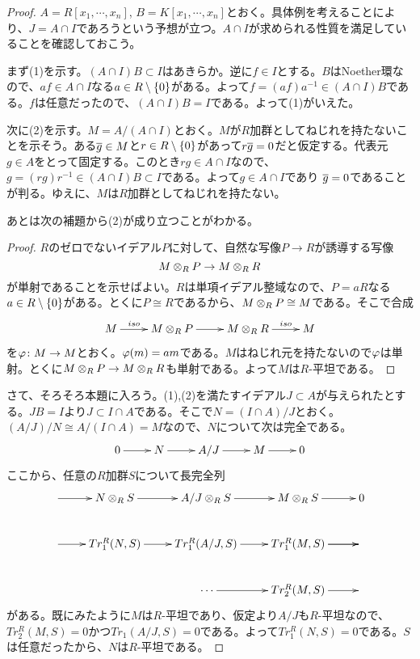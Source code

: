 \begin{proof}
  $A = R[x_1, \cdots , x_n]$, $B = K[x_1, \cdots , x_n]$とおく。具体例を考えることにより、$J=A \cap I$であろうという予想が立つ。$A \cap I$が求められる性質を満足していることを確認しておこう。

  まず(1)を示す。$(A \cap I)B \subset I$はあきらか。逆に$f \in I$とする。$B$はNoether環なので、$af \in A \cap I$なる$a \in R \setminus \{0\}$がある。よって$f = (af)a^{-1} \in (A \cap I)B$である。$f$は任意だったので、$(A \cap I)B = I$である。よって(1)がいえた。

  次に(2)を示す。$M = A/(A \cap I)$とおく。$M$が$R$加群としてねじれを持たないことを示そう。ある$\overline{g} \in M$と$r \in R \setminus \{0\}$があって$r \overline{g} = 0$だと仮定する。代表元$g \in A$をとって固定する。このとき$rg \in A \cap I$なので、$g = (rg)r^{-1} \in (A \cap I)B \subset I$である。よって$g \in A \cap I$であり
  $\overline{g} = 0$であることが判る。ゆえに、$M$は$R$加群としてねじれを持たない。

あとは次の補題から(2)が成り立つことがわかる。
\begin{proof}
  $R$のゼロでないイデアル$P$に対して、自然な写像$P \to R$が誘導する写像
  \[
  M \otimes_R P \to M \otimes_R R
  \]
  が単射であることを示せばよい。$R$は単項イデアル整域なので、$P = aR$なる$a \in R \setminus \{ 0 \}$がある。とくに$P \cong R$であるから、$M \otimes_R P \cong M$である。そこで合成
  \[
  \xymatrix{
  M \ar[r]^-{iso} & M \ts_R P  \ar[r] & M \ts_R R \ar[r]^-{iso} & M
  }
  \]
  を${\varphi} \colon M \to M$とおく。${\varphi}(m)=am$である。$M$はねじれ元を持たないので${\varphi}$は単射。とくに$  M \otimes_R P \to M \otimes_R R$も単射である。よって$M$は$R$-平坦である。
\end{proof}

さて、そろそろ本題に入ろう。(1),(2)を満たすイデアル$J \subset A$が与えられたとする。$JB=I$より$J \subset I \cap A$である。そこで$N = (I \cap A)/J$とおく。$(A/J)/N \cong A/ (I \cap A) = M$なので、$N$について次は完全である。
\[
\xymatrix{
0 \ar[r] & N \ar[r] & A/J \ar[r] & M \ar[r] & 0
}
\]
ここから、任意の$R$加群$S$について長完全列
\[
\xymatrix{
{} \ar[r] & N \ts_R S \ar[r] & A/J \ts_R S \ar[r] & M \ts_R S \ar[r] & 0 \\
{} \ar[r] & Tr_1^R(N,S) \ar[r] & Tr_1^R(A/J,S) \ar[r] & Tr_1^R(M,S) \ar[r] \ar[r] & {} \\
{}        & {}               &  {}         \cdots \ar[r]          &   Tr_2^R(M,S)   \ar[r] &
}
\]
がある。既にみたように$M$は$R$-平坦であり、仮定より$A/J$も$R$-平坦なので、$Tr_2^R(M,S)=0$かつ$Tr_1(A/J,S) = 0$である。よって$Tr_1^R(N,S)=0$である。$S$は任意だったから、$N$は$R$-平坦である。


\end{proof}
